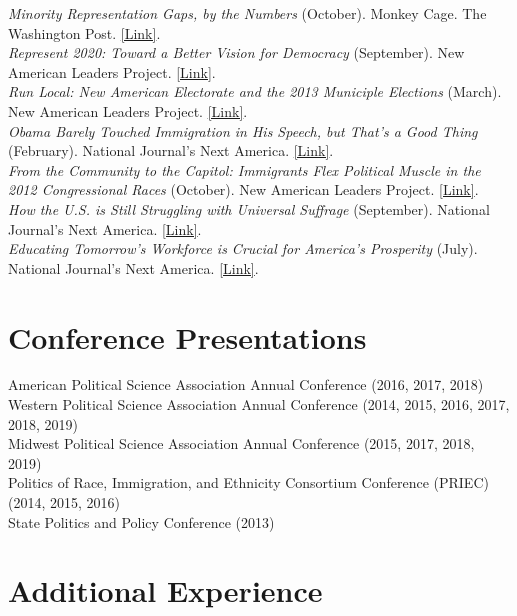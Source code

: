 \documentclass[11pt, a4paper]{article}
\newcommand{\years}[1]{\marginnote{\scriptsize #1}}
\begin{document}
\years{2014}\textit{Minority Representation Gaps, by the Numbers} (October). Monkey Cage. The Washington Post. \href{http://wapo.st/ZGQntG}{[Link]}.\\
\years{}\textit{Represent 2020: Toward a Better Vision for Democracy} (September). New American Leaders Project. \href{http://bit.ly/1tLsVcV}{[Link]}.\\
\years{2013}\textit{Run Local: New American Electorate and the 2013 Municiple Elections} (March). New American Leaders Project. \href{http://bit.ly/WKwtGR}{[Link]}.\\
\years{}\textit{Obama Barely Touched Immigration in His Speech, but That's a Good Thing} (February). National Journal's Next America. \href{http://bit.ly/12R7lVG}{[Link]}.\\
\years{2012}\textit{From the Community to the Capitol: Immigrants Flex Political Muscle in the 2012 Congressional Races} (October). New American Leaders Project. \href{http://bit.ly/RLVzVF}{[Link]}.\\
\years{}\textit{How the U.S. is Still Struggling with Universal Suffrage} (September). National Journal's Next America.  \href{http://bit.ly/UDAUpD}{[Link]}.\\
\years{}\textit{Educating Tomorrow's Workforce is Crucial for America's Prosperity} (July). National Journal's Next America. \href{http://bit.ly/NCHoyf}{[Link]}.\\

\section*{Conference Presentations}

\years{}American Political Science Association Annual Conference (2016, 2017, 2018)\\
\years{}Western Political Science Association Annual Conference (2014, 2015, 2016, 2017, 2018, 2019)\\
\years{}Midwest Political Science Association Annual Conference (2015, 2017, 2018, 2019)\\
\years{}Politics of Race, Immigration, and Ethnicity Consortium Conference (PRIEC) (2014, 2015, 2016)\\
\years{}State Politics and Policy Conference (2013)

\section*{Additional Experience}
\end{document}

